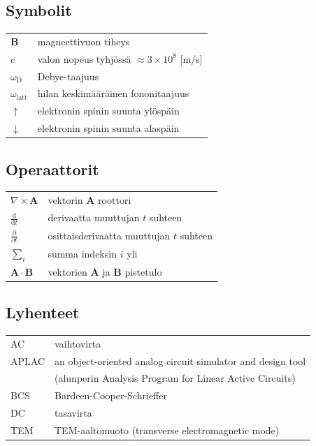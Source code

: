 \documentclass[finnish, 12pt, a4paper, arts, utf8, a-2b, online]{aaltothesis}
\begin{document}
\newpage



\thesistableofcontents



\subsection*{Symbolit}

\begin{tabular}{ll}
$\mathbf{B}$  & magneettivuon tiheys  \\
$c$              & valon nopeus tyhjössä $\approx 3\times10^8$ [m/s]\\
$\omega_{\mathrm{D}}$    & Debye-taajuus \\
$\omega_{\mathrm{latt}}$ & hilan keskimääräinen fononitaajuus \\
$\uparrow$       & elektronin spinin suunta ylöspäin\\
$\downarrow$     & elektronin spinin suunta alaspäin
\end{tabular}

\subsection*{Operaattorit}

\begin{tabular}{ll}
$\nabla \times \mathbf{A}$              & vektorin $\mathbf{A}$ roottori\\
$\displaystyle\frac{\mbox{d}}{\mbox{d} t}$ & derivaatta muuttujan $t$ 
suhteen\\[3mm]
$\displaystyle\frac{\partial}{\partial t}$  & osittaisderivaatta muuttujan $t$ 
suhteen \\[3mm]
$\sum_i $                       & summa indeksin $i$ yli\\
$\mathbf{A} \cdot \mathbf{B}$    & vektorien $\mathbf{A}$ ja $\mathbf{B}$ 
pistetulo
\end{tabular}

\subsection*{Lyhenteet}

\begin{tabular}{ll}
AC         & vaihtovirta \\
APLAC      & an object-oriented analog circuit simulator and design tool \\
           & (alunperin Analysis Program for Linear Active Circuits) \\
BCS        & Bardeen-Cooper-Schrieffer \\ %
DC         & tasavirta \\
TEM        & TEM-aaltomuoto (transverse electromagnetic mode)
\end{tabular}
\end{document}
